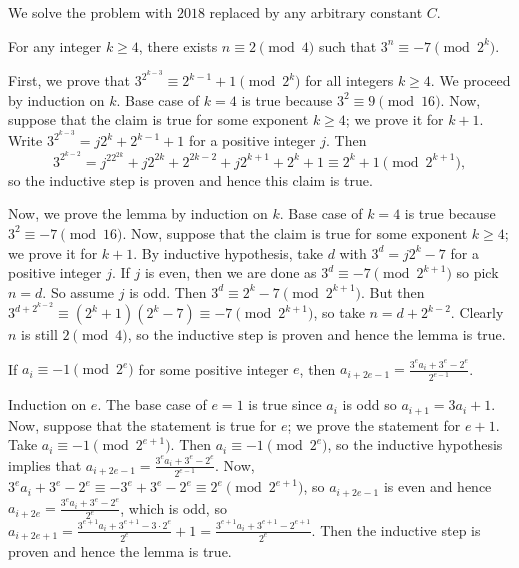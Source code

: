 We solve the problem with $2018$ replaced by any arbitrary constant $C$.

\begin{solutionlemma}
For any integer $k\geq4$, there exists $n\equiv2\pmod4$ such that $3^n\equiv-7\pmod{2^k}$.
\end{solutionlemma}

\begin{lemmaproof}
First, we prove that $3^{2^{k-3}}\equiv2^{k-1}+1\pmod{2^k}$ for all integers $k\geq4$. We proceed by induction on $k$. Base case of $k=4$ is true because $3^2\equiv9\pmod{16}$. Now, suppose that the claim is true for some exponent $k\geq4$; we prove it for $k+1$. Write $3^{2^{k-3}}=j2^k+2^{k-1}+1$ for a positive integer $j$. Then \[3^{2^{k-2}}=j^22^{2k}+j2^{2k}+2^{2k-2}+j2^{k+1}+2^k+1\equiv2^k+1\pmod{2^{k+1}},\] so the inductive step is proven and hence this claim is true.

Now, we prove the lemma by induction on $k$. Base case of $k=4$ is true because $3^2\equiv-7\pmod{16}$. Now, suppose that the claim is true for some exponent $k\geq4$; we prove it for $k+1$. By inductive hypothesis, take $d$ with $3^d=j2^k-7$ for a positive integer $j$. If $j$ is even, then we are done as $3^d\equiv-7\pmod{2^{k+1}}$ so pick $n=d$. So assume $j$ is odd. Then $3^d\equiv2^k-7\pmod{2^{k+1}}$. But then $3^{d+2^{k-2}}\equiv\left(2^k+1\right)\left(2^k-7\right)\equiv-7\pmod{2^{k+1}}$, so take $n=d+2^{k-2}$. Clearly $n$ is still $2\pmod4$, so the inductive step is proven and hence the lemma is true.
\end{lemmaproof}

\begin{solutionlemma}
If $a_i\equiv-1\pmod{2^e}$ for some positive integer $e$, then $a_{i+2e-1}=\frac{3^ea_i+3^e-2^e}{2^{e-1}}$.
\end{solutionlemma}

\begin{lemmaproof}
Induction on $e$. The base case of $e=1$ is true since $a_i$ is odd so $a_{i+1}=3a_i+1$. Now, suppose that the statement is true for $e$; we prove the statement for $e+1$. Take $a_i\equiv-1\pmod{2^{e+1}}$. Then $a_i\equiv-1\pmod{2^e}$, so the inductive hypothesis implies that $a_{i+2e-1}=\frac{3^ea_i+3^e-2^e}{2^{e-1}}$. Now, $3^ea_i+3^e-2^e\equiv-3^e+3^e-2^e\equiv2^e\pmod{2^{e+1}}$, so $a_{i+2e-1}$ is even and hence $a_{i+2e}=\frac{3^ea_i+3^e-2^e}{2^e}$, which is odd, so $a_{i+2e+1}=\frac{3^{e+1}a_i+3^{e+1}-3\cdot2^e}{2^e}+1=\frac{3^{e+1}a_i+3^{e+1}-2^{e+1}}{2^e}$. Then the inductive step is proven and hence the lemma is true.
\end{lemmaproof}

